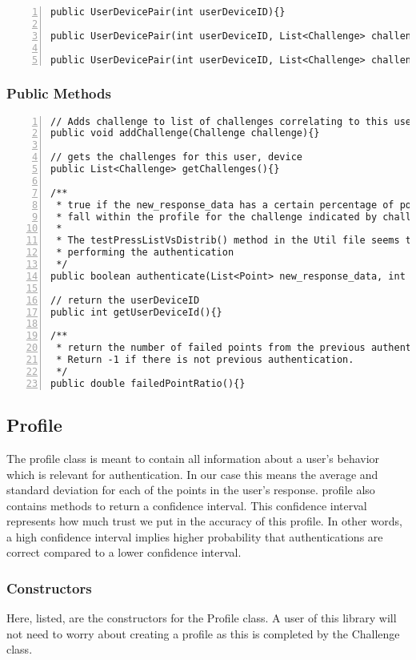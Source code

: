 \documentclass{article} %
\begin{document}
\begin{lstlisting}[numbers=left]
public UserDevicePair(int userDeviceID){}

public UserDevicePair(int userDeviceID, List<Challenge> challenges){}

public UserDevicePair(int userDeviceID, List<Challenge> challenges, double allowed_deviations, double authentication_threshold){}
\end{lstlisting}

\subsubsection{Public Methods}
\begin{lstlisting}[numbers=left]
// Adds challenge to list of challenges correlating to this user/device pair
public void addChallenge(Challenge challenge){}

// gets the challenges for this user, device
public List<Challenge> getChallenges(){}

/**
 * true if the new_response_data has a certain percentage of points which
 * fall within the profile for the challenge indicated by challenge_id
 * 
 * The testPressListVsDistrib() method in the Util file seems to be
 * performing the authentication
 */
public boolean authenticate(List<Point> new_response_data, int challenge_id){}

// return the userDeviceID
public int getUserDeviceId(){}

/**
 * return the number of failed points from the previous authentication.
 * Return -1 if there is not previous authentication.
 */
public double failedPointRatio(){}
\end{lstlisting}

\subsection{Profile}
The profile class is meant to contain all information about a user's behavior which is relevant for authentication.
In our case this means the average and standard deviation for each of the points in the user's response.
profile also contains methods to return a confidence interval. This confidence interval represents how much trust we put in the accuracy of this profile.
In other words, a high confidence interval implies higher probability that authentications are correct compared to a lower confidence interval.

\subsubsection{Constructors}
Here, listed, are the constructors for the Profile class.
A user of this library will not need to worry about creating a profile as this is completed by the Challenge class.
\end{document}
